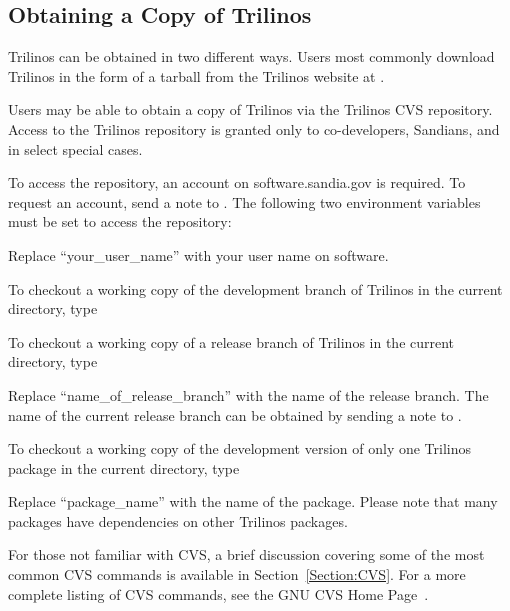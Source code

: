 \documentclass[12pt,relax]{TrilinosUserGuide}
\begin{document}
\subsection{Obtaining a Copy of Trilinos}

Trilinos can be obtained in two different ways.  Users most commonly 
download Trilinos in the form of a tarball from the Trilinos website at 
\newline {}.

Users may be able to obtain a 
copy of Trilinos via the Trilinos CVS repository.  Access to the Trilinos 
repository is granted only to co-developers, Sandians, and in select 
special cases.

To access the repository, an account on software.sandia.gov is required.  
To request an account, send a note 
to .  
The following two environment variables must be set to access the repository:


Replace ``your\_user\_name'' with your user name on software.

To checkout a working copy of the development branch of Trilinos in the 
current directory, type


To checkout a working copy of a release branch of Trilinos in the current 
directory, type


Replace ``name\_of\_release\_branch'' with the name of the release branch.
The name of the current release branch can be obtained by sending a note to
\newline {}.

To checkout a working copy of the development version of only one Trilinos 
package in the current directory, type


Replace ``package\_name'' with the name of the package.  Please note 
that many packages have dependencies on other Trilinos packages.

For those not familiar with CVS, a brief discussion covering some of the most 
common CVS commands is available in Section~\ref{Section:CVS}.  For a more 
complete listing of CVS commands, see the GNU CVS Home Page~\cite{CVS}.
\end{document}
